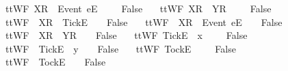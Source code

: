 \begin{isabellebody}
\ \ {\isachardoublequoteopen}ttWF{}\ {\isacharparenleft}{\isacharbrackleft}X{\isacharbrackright}\isactrlsub R\ {\isacharhash}\ {\isacharbrackleft}Event\ e{\isacharbrackright}\isactrlsub E\ {\isacharhash}\ {\isasymrho}{\isacharparenright}\ {\isasymsigma}\ {\isacharequal}\ False{\isachardoublequoteclose}\ {\isacharbar}\isanewline
\ \ {\isachardoublequoteopen}ttWF{}\ {\isacharparenleft}{\isacharbrackleft}X{\isacharbrackright}\isactrlsub R\ {\isacharhash}\ {\isacharbrackleft}Y{\isacharbrackright}\isactrlsub R\ {\isacharhash}\ {\isasymrho}{\isacharparenright}\ {\isasymsigma}\ {\isacharequal}\ False{\isachardoublequoteclose}\ {\isacharbar}\isanewline
\ \ {\isachardoublequoteopen}ttWF{}\ {\isasymrho}\ {\isacharparenleft}{\isacharbrackleft}X{\isacharbrackright}\isactrlsub R\ {\isacharhash}\ {\isacharbrackleft}Tick{\isacharbrackright}\isactrlsub E\ {\isacharhash}\ {\isasymsigma}{\isacharparenright}\ {\isacharequal}\ False{\isachardoublequoteclose}\ {\isacharbar}\isanewline
\ \ {\isachardoublequoteopen}ttWF{}\ {\isasymrho}\ {\isacharparenleft}{\isacharbrackleft}X{\isacharbrackright}\isactrlsub R\ {\isacharhash}\ {\isacharbrackleft}Event\ e{\isacharbrackright}\isactrlsub E\ {\isacharhash}\ {\isasymsigma}{\isacharparenright}\ {\isacharequal}\ False{\isachardoublequoteclose}\ {\isacharbar}\isanewline
\ \ {\isachardoublequoteopen}ttWF{}\ {\isasymrho}\ {\isacharparenleft}{\isacharbrackleft}X{\isacharbrackright}\isactrlsub R\ {\isacharhash}\ {\isacharbrackleft}Y{\isacharbrackright}\isactrlsub R\ {\isacharhash}\ {\isasymsigma}{\isacharparenright}\ {\isacharequal}\ False{\isachardoublequoteclose}\ {\isacharbar}\isanewline
\ \ {\isachardoublequoteopen}ttWF{}\ {\isacharparenleft}{\isacharbrackleft}Tick{\isacharbrackright}\isactrlsub E\ {\isacharhash}\ x\ {\isacharhash}\ {\isasymrho}{\isacharparenright}\ {\isasymsigma}\ {\isacharequal}\ False{\isachardoublequoteclose}\ {\isacharbar}\isanewline
\ \ {\isachardoublequoteopen}ttWF{}\ {\isasymrho}\ {\isacharparenleft}{\isacharbrackleft}Tick{\isacharbrackright}\isactrlsub E\ {\isacharhash}\ y\ {\isacharhash}\ {\isasymsigma}{\isacharparenright}\ {\isacharequal}\ False{\isachardoublequoteclose}\ {\isacharbar}\isanewline
\ \ {\isachardoublequoteopen}ttWF{}\ {\isacharparenleft}{\isacharbrackleft}Tock{\isacharbrackright}\isactrlsub E\ {\isacharhash}\ {\isasymrho}{\isacharparenright}\ {\isasymsigma}\ {\isacharequal}\ False{\isachardoublequoteclose}\ {\isacharbar}\isanewline
\ \ {\isachardoublequoteopen}ttWF{}\ {\isasymrho}\ {\isacharparenleft}{\isacharbrackleft}Tock{\isacharbrackright}\isactrlsub E\ {\isacharhash}\ {\isasymsigma}{\isacharparenright}\ {\isacharequal}\ False{\isachardoublequoteclose}\isanewline

\end{isabellebody}
